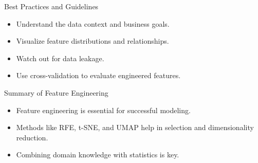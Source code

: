 \documentclass[aspectratio=169]{beamer}
\begin{document}
\begin{frame}[label={sec:org8a8e006}]{Best Practices and Guidelines}
\begin{itemize}
\item Understand the data context and business goals.
\item Visualize feature distributions and relationships.
\item Watch out for data leakage.
\item Use cross-validation to evaluate engineered features.
\end{itemize}
\end{frame}

\begin{frame}[label={sec:org2686c5c}]{Summary of Feature Engineering}
\begin{itemize}
\item Feature engineering is essential for successful modeling.
\item Methods like RFE, t-SNE, and UMAP help in selection and dimensionality reduction.
\item Combining domain knowledge with statistics is key.
\end{itemize}
\end{frame}
\end{document}
